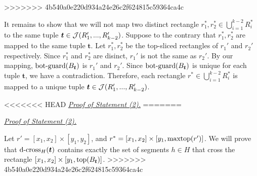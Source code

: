 \vgap 
>>>>>>> 4b540a0e220d934a24e26c2f624815c59364ca4c

It remains to show that we will not map two distinct rectangle $r_1^*, r_2^*\in \bigcup_{i = 1}^{k-2}R_i^*$ to the same tuple $\textrm{\boldmath${t}$}\in \mathcal{J}(R_1',...,R_{k-2}')$. Suppose to the contrary that $r_1^*, r_2^*$ are mapped to the same tuple $\bm{t}$. Let $r_1^*, r_2^*$ be the top-sliced rectangles of $r_1'$ and $r_2'$ respectively. Since $r_1^*$ and $r_2^*$ are disinct, $r_1'$ is not the same as $r_2'$. By our mapping, $\mathrm{bot\text{-}guard}(B_{\textrm{\boldmath${t}$}})$ is $r_1'$ and $r_2'$. Since $\mathrm{bot\text{-}guard}(B_{\textrm{\boldmath${t}$}})$ is unique for each tuple $\bm{t}$, we have a contradiction. Therefore, each rectangle $r^*\in \bigcup_{i = 1}^{k-2}R_i^*$ is mapped to a unique tuple $\textrm{\boldmath${t}$}\in \mathcal{J}(R_1',...,R_{k-2}')$.

<<<<<<< HEAD
\noindent \underline{\em Proof of Statement (2).} 
=======
\vgap
 
\noindent \underline{\em Proof of Statement (2).} 


Let $r' = [x_1,x_2]\times [y_1,y_2]$, and $r^* = [x_1,x_2] \times [y_1,\mathrm{maxtop}(r')]$. We will prove that $\mathrm{d\text{-}cross}_H(\textrm{\boldmath${t}$})$ contains exactly the set of segments $h\in H$ that cross the rectangle $[x_1,x_2]\times [y_1,\mathrm{top}(B_{\textrm{\boldmath${t}$}})]$.
>>>>>>> 4b540a0e220d934a24e26c2f624815c59364ca4c
